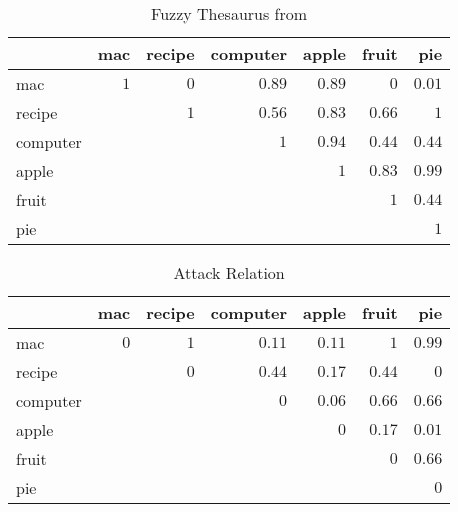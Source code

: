 \documentclass[12pt,a4paper]{article}
\begin{document}


\begin{example}\label{vbqueryexp1}
\renewcommand{\tabcolsep}{0.2em}
\begin{table}[htb]
\caption{Fuzzy Thesaurus from \cite{FuzzyRoughSets2}\label{thesaurus}}
\centering
{\footnotesize
\begin{tabular}{|l|r|r|r|r|r|r|}
    \hline
&mac&recipe&computer&apple&fruit&pie\\
    \hline
mac&  $1$  &  $0$ &   $0.89$ & $0.89$ & $0$ & $0.01$\\
recipe&    &  $1$ &   $0.56$ & $0.83$ & $0.66$ & $1$\\
computer&  &      &   $1$    & $0.94$  & $0.44$ & $0.44$\\
apple &     &      &          & $1$     & $0.83$ & $0.99$\\
fruit &     &      &          &         & $1$ & $0.44$\\
pie   &     &      &          &         &     & $1$ \\
    \hline
\end{tabular}
}
\end{table}


\begin{table}[htb]
\caption{Attack Relation}\label{attack-relation}
\centering
{\footnotesize
\begin{tabular}{|l|r|r|r|r|r|r|}
    \hline
&mac&recipe&computer&apple&fruit&pie\\
    \hline
mac&  $0$  &  $1$ &   $0.11$ & $0.11$ & $1$ & $0.99$\\
recipe&    &  $0$ &   $0.44$ & $0.17$ & $0.44$ & $0$\\
computer&  &      &   $0$    & $0.06$  & $0.66$ & $0.66$\\
apple &     &      &          & $0$     & $0.17$ & $0.01$\\
fruit &     &      &          &         & $0$ & $0.66$\\
pie   &     &      &          &         &     & $0$ \\
    \hline
\end{tabular}
}
\end{table}


\end{example}
\end{document}
